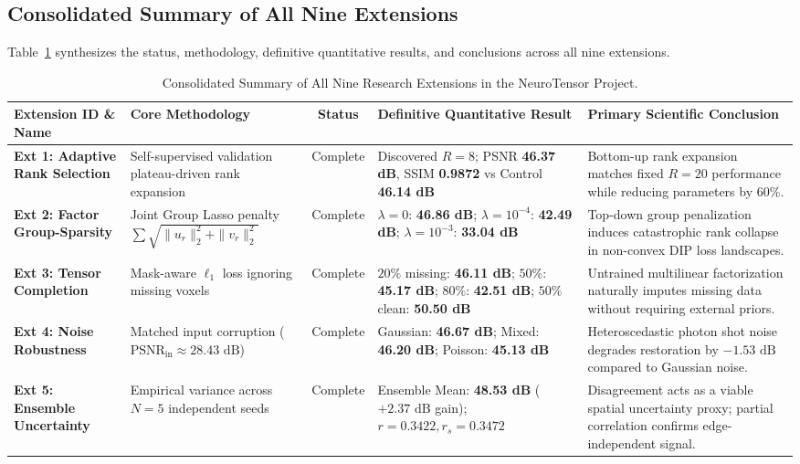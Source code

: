 \subsection{Consolidated Summary of All Nine Extensions}
\label{subsec:consolidated_summary}
Table~\ref{tab:consolidated_extensions_summary} synthesizes the status, methodology, definitive quantitative results, and conclusions across all nine extensions.

\begin{table}[htbp]
\centering
\caption{Consolidated Summary of All Nine Research Extensions in the NeuroTensor Project.}
\label{tab:consolidated_extensions_summary}
\begin{adjustbox}{width=\textwidth}
\begin{tabular}{lp{3.8cm}cp{4.6cm}p{4.6cm}}
\toprule
\textbf{Extension ID \& Name} & \textbf{Core Methodology} & \textbf{Status} & \textbf{Definitive Quantitative Result} & \textbf{Primary Scientific Conclusion} \\
\midrule
\textbf{Ext 1: Adaptive Rank Selection} & Self-supervised validation plateau-driven rank expansion & Complete & Discovered $R=8$; PSNR \textbf{46.37 dB}, SSIM \textbf{0.9872} vs Control \textbf{46.14 dB} & Bottom-up rank expansion matches fixed $R=20$ performance while reducing parameters by $60\%$. \\
\midrule
\textbf{Ext 2: Factor Group-Sparsity} & Joint Group Lasso penalty $\sum \sqrt{\|u_r\|_2^2 + \|v_r\|_2^2}$ & Complete & $\lambda=0$: \textbf{46.86 dB}; $\lambda=10^{-4}$: \textbf{42.49 dB}; $\lambda=10^{-3}$: \textbf{33.04 dB} & Top-down group penalization induces catastrophic rank collapse in non-convex DIP loss landscapes. \\
\midrule
\textbf{Ext 3: Tensor Completion} & Mask-aware $\ell_1$ loss ignoring missing voxels & Complete & $20\%$ missing: \textbf{46.11 dB}; $50\%$: \textbf{45.17 dB}; $80\%$: \textbf{42.51 dB}; $50\%$ clean: \textbf{50.50 dB} & Untrained multilinear factorization naturally imputes missing data without requiring external priors. \\
\midrule
\textbf{Ext 4: Noise Robustness} & Matched input corruption ($\text{PSNR}_\text{in} \approx 28.43\text{ dB}$) & Complete & Gaussian: \textbf{46.67 dB}; Mixed: \textbf{46.20 dB}; Poisson: \textbf{45.13 dB} & Heteroscedastic photon shot noise degrades restoration by $-1.53\text{ dB}$ compared to Gaussian noise. \\
\midrule
\textbf{Ext 5: Ensemble Uncertainty} & Empirical variance across $N=5$ independent seeds & Complete & Ensemble Mean: \textbf{48.53 dB} ($+2.37\text{ dB}$ gain); $r = 0.3422, r_s = 0.3472$ & Disagreement acts as a viable spatial uncertainty proxy; partial correlation confirms edge-independent signal. \\

\end{tabular}
\end{adjustbox}
\end{table}
